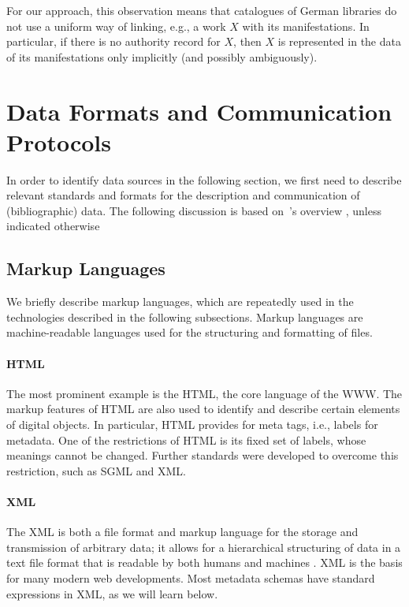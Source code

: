 For our approach, this observation means that catalogues of German libraries
do not use a uniform way of linking, e.g., a work $X$ with its manifestations.
In particular, if there is no authority record for $X$,
then $X$ is represented in the data of its manifestations only implicitly 
(and possibly ambiguously).


\section{Data Formats and Communication Protocols}
\label{sec:data_models}

In order to identify data sources in the following section,
we first need to describe relevant standards and formats for the description
and communication of (bibliographic) data.
The following discussion 
is based on~\citeauthor{Hider2008}'s overview \autocite*[§10]{Hider2008},
unless indicated otherwise

\subsection{Markup Languages}
\label{subsec:markup}

We briefly describe markup languages, which are repeatedly used in the technologies
described in the following subsections.
Markup languages are machine-readable languages used for the structuring and formatting of files.

\paragraph{HTML}
The most prominent example is the \gls{HTML}, the core language of the \gls{WWW}.
The markup features of HTML are also used to identify and describe certain elements of digital objects.
In particular, HTML provides for meta tags, i.e., labels for metadata.
One of the restrictions of HTML is its fixed set of labels, whose meanings cannot be changed.
Further standards were developed to overcome this restriction,
such as SGML and XML.

\paragraph{XML}
%
The \gls{XML} is both a file format and markup language for the storage and transmission of arbitrary data;
it allows for a hierarchical structuring of data in a text file format that is readable by both humans and machines
\autocite{WikiXML}.
XML is the basis for many modern web developments.
Most metadata schemas have standard expressions in XML, as we will learn below.

